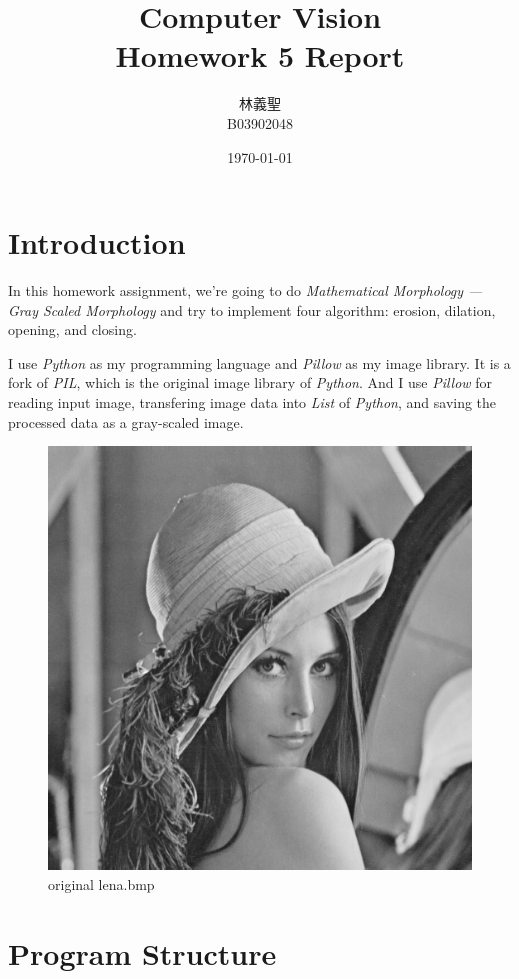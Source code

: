 \documentclass[14pt,a4paper]{extarticle}
\title{Computer Vision\\Homework 5 Report}
\author{林義聖\\B03902048}
\date{\today}
\begin{document}
\maketitle
\thispagestyle{fancy}

\section{Introduction}

In this homework assignment, we're going to do \textit{Mathematical Morphology --- Gray Scaled Morphology} and try to implement four algorithm: erosion, dilation, opening, and closing.

I use \textit{Python} as my programming language and \textit{Pillow} as my image library. It is a fork of \textit{PIL}, which is the original image library of \textit{Python}. And I use \textit{Pillow} for reading input image, transfering image data into \textit{List} of \textit{Python}, and saving the processed data as a gray-scaled image.

\begin{figure}[H]
\centering
\includegraphics[scale=0.5]{lena.bmp}
\caption{original lena.bmp}
\label{fig:lena.bmp}
\end{figure}

\section{Program Structure}
\end{document}
